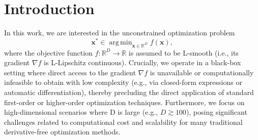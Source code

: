 \documentclass[10pt]{article} %
\numberwithin{equation}{section}
\theoremstyle{plain}
\theoremstyle{definition}
\newcommand{\<}{\langle}
\renewcommand{\>}{\rangle}
\renewcommand{\(}{\left(}
\renewcommand{\)}{\right)}
\renewcommand{\[}{\left[}
\renewcommand{\]}{\right]}
\DeclareMathOperator*{\argmin}{arg\,min}
\def\R{{\mathbb R}}
\def\R{{\mathbb R}}
\newcommand{\alphaMax}{\alpha_\textup{max}}
\newcommand{\Lip}{L}
\begin{document}

\section{Introduction}
\label{sec:intro} 

\noindent In this work, we are interested in the unconstrained optimization problem
\begin{equation}\label{eq:main_problem}
    \bm x^\ast \in \argmin_{\bm x \in \R^D} f(\bm x),
\end{equation}
where the objective function $f: \mathbb{R}^D \to \mathbb{R}$ is assumed to be L-smooth (i.e., its gradient $\nabla f$ is L-Lipschitz continuous). Crucially, we operate in a black-box setting where direct access to the gradient $\nabla f$ is unavailable or computationally infeasible to obtain with low complexity (e.g., via closed-form expressions or automatic differentiation), thereby precluding the direct application of standard first-order or higher-order optimization techniques. Furthermore, we focus on high-dimensional scenarios where D is large (e.g., $D \gtrsim 100$), posing significant challenges related to computational cost and scalability for many traditional derivative-free optimization methods.
\end{document}

